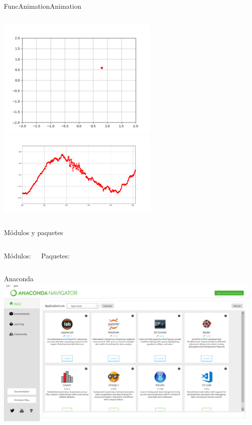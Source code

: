  \begin{frame}{FuncAnimation}{Animation}
    \begin{columns}
       
       \center\includegraphics[width=0.6\textwidth]{python/euler1}
       \center\includegraphics[width=0.6\textwidth]{python/visualize}
    \end{columns}
    \vfill
 \end{frame}
 \begin{frame}{Módulos y paquetes}
    \begin{columns}
       Módulos:
       
       Paquetes:
       
    \end{columns}
    \vfill
 \end{frame}
 \begin{frame}{Anaconda}
       \center\includegraphics[width=1\textwidth]{python/anaconda}
    \vfill
 \end{frame}
